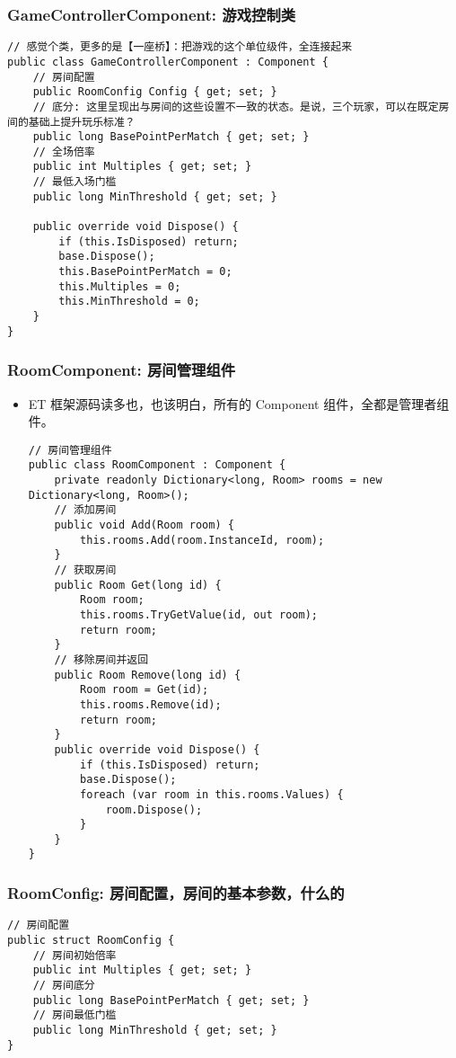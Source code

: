 \documentclass[9pt, b5paper]{article}
\begin{document}
\subsubsection{GameControllerComponent: 游戏控制类}
\label{sec-1-5-4}
\begin{verbatim}
// 感觉个类，更多的是【一座桥】：把游戏的这个单位级件，全连接起来
public class GameControllerComponent : Component {
    // 房间配置
    public RoomConfig Config { get; set; }
    // 底分: 这里呈现出与房间的这些设置不一致的状态。是说，三个玩家，可以在既定房间的基础上提升玩乐标准？
    public long BasePointPerMatch { get; set; }
    // 全场倍率
    public int Multiples { get; set; }
    // 最低入场门槛
    public long MinThreshold { get; set; }

    public override void Dispose() {
        if (this.IsDisposed) return;
        base.Dispose();
        this.BasePointPerMatch = 0;
        this.Multiples = 0;
        this.MinThreshold = 0;
    }
}
\end{verbatim}
\subsubsection{RoomComponent: 房间管理组件}
\label{sec-1-5-5}
\begin{itemize}
\item ET 框架源码读多也，也该明白，所有的 Component 组件，全都是管理者组件。
\begin{verbatim}
// 房间管理组件
public class RoomComponent : Component {
    private readonly Dictionary<long, Room> rooms = new Dictionary<long, Room>();
    // 添加房间
    public void Add(Room room) {
        this.rooms.Add(room.InstanceId, room);
    }
    // 获取房间
    public Room Get(long id) {
        Room room;
        this.rooms.TryGetValue(id, out room);
        return room;
    }
    // 移除房间并返回
    public Room Remove(long id) {
        Room room = Get(id);
        this.rooms.Remove(id);
        return room;
    }
    public override void Dispose() {
        if (this.IsDisposed) return;
        base.Dispose();
        foreach (var room in this.rooms.Values) {
            room.Dispose();
        }
    }
}
\end{verbatim}
\end{itemize}
\subsubsection{RoomConfig: 房间配置，房间的基本参数，什么的}
\label{sec-1-5-6}
\begin{verbatim}
// 房间配置
public struct RoomConfig {
    // 房间初始倍率
    public int Multiples { get; set; }
    // 房间底分
    public long BasePointPerMatch { get; set; }
    // 房间最低门槛
    public long MinThreshold { get; set; }
}
\end{verbatim}
\end{document}
